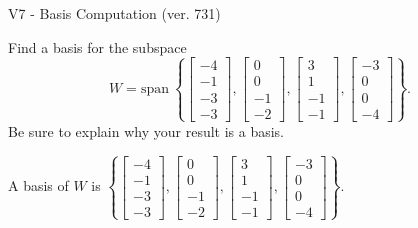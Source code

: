 \begin{exercise}
  \begin{exerciseTitle}V7 - Basis Computation (ver. 731)\end{exerciseTitle}
  \begin{exerciseStatement}
    Find a basis for the subspace 
\[W=\mathrm{span}\ \left\{\left[\begin{array}{r}
-4 \\
-1 \\
-3 \\
-3
\end{array}\right] , \left[\begin{array}{r}
0 \\
0 \\
-1 \\
-2
\end{array}\right] , \left[\begin{array}{r}
3 \\
1 \\
-1 \\
-1
\end{array}\right] , \left[\begin{array}{r}
-3 \\
0 \\
0 \\
-4
\end{array}\right]\right\}.\]
 Be sure to explain why your result is a basis.


  \end{exerciseStatement}
  \begin{exerciseAnswer}
   A basis of \(W\) is  \(\left\{\left[\begin{array}{r}
-4 \\
-1 \\
-3 \\
-3
\end{array}\right] , \left[\begin{array}{r}
0 \\
0 \\
-1 \\
-2
\end{array}\right] , \left[\begin{array}{r}
3 \\
1 \\
-1 \\
-1
\end{array}\right] , \left[\begin{array}{r}
-3 \\
0 \\
0 \\
-4
\end{array}\right]\right\}\).
  


  \end{exerciseAnswer}
\end{exercise}